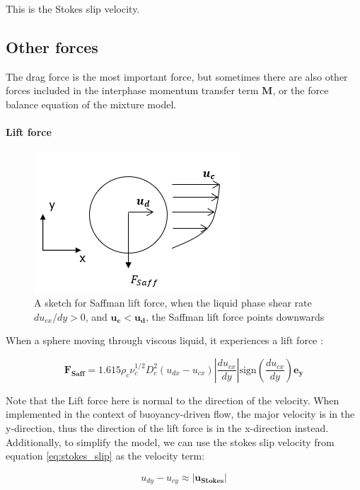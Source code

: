 This is the Stokes slip velocity.

\subsection{Other forces}\label{otherforces}

The drag force is the most important force, but sometimes there are also other forces included in the interphase momentum transfer term $\mathbf{M}$, or the force balance equation of the mixture model. 

\paragraph{Lift force}
\*

\begin{figure}[H]
    \centering
    \includegraphics{saffman.png}
    \caption{A sketch for Saffman lift force, when the liquid phase shear rate $du_{cx}/dy>0$, and $\mathbf{u_c}<\mathbf{u_d}$, the Saffman lift force points downwards}
    \label{Saffman}
\end{figure}

When a sphere moving through viscous liquid, it experiences a lift force \cite{saffman1965lift}:

\begin{equation}\label{eq:lift}
    \mathbf{ F_{Saff} } = 1.615 \rho_c \nu_c^{1/2} D_e^2 (u_{dx} - u_{cx})|\frac{d u_{cx}}{d y}|\mathrm{sign}(\frac{d u_{cx}}{d y})\mathbf{e_y}
\end{equation}

Note that the Lift force here is normal to the direction of the velocity. When implemented in the context of buoyancy-driven flow, the major velocity is in the y-direction, thus the direction of the lift force is in the x-direction instead. Additionally, to simplify the model, we can use the stokes slip velocity from equation \ref{eq:stokes_slip} as the velocity term:

\begin{equation}
    u_{dy} - u_{cy} \approx |\mathbf{u_{Stokes}}|
\end{equation}

